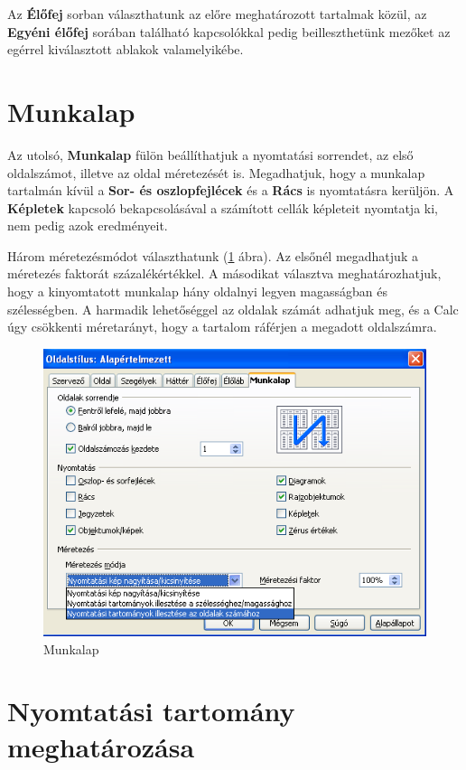 Az \textbf{Élőfej} sorban választhatunk az előre
meghatározott tartalmak közül, az \textbf{Egyéni élőfej}
sorában található kapcsolókkal pedig beilleszthetünk
mezőket az egérrel kiválasztott ablakok valamelyikébe.


\section{Munkalap}

Az utolsó, \textbf{Munkalap} fülön beállíthatjuk a
nyomtatási sorrendet, az első oldalszámot, illetve az oldal
méretezését is. Megadhatjuk, hogy a munkalap tartalmán
kívül a \textbf{Sor- és oszlopfejlécek} és a \textbf{Rács}
is nyomtatásra kerüljön. A \textbf{Képletek} kapcsoló
bekapcsolásával a számított cellák képleteit nyomtatja ki,
nem pedig azok eredményeit.

Három méretezésmódot választhatunk (\ref{Munkalap} ábra). Az
elsőnél megadhatjuk a méretezés faktorát
százalékértékkel. A másodikat választva meghatározhatjuk,
hogy a kinyomtatott munkalap hány oldalnyi legyen magasságban és
szélességben. A harmadik lehetőséggel az oldalak számát
adhatjuk meg, és a Calc úgy csökkenti méretarányt, hogy a
tartalom ráférjen a megadott oldalszámra.

\begin{figure}[!h]
\begin{center}
\includegraphics[width=12.891cm]{oocalcv2-img167.png}
\caption{Munkalap}\label{Munkalap}
\end{center}
\end{figure}


\section{Nyomtatási tartomány meghatározása}

